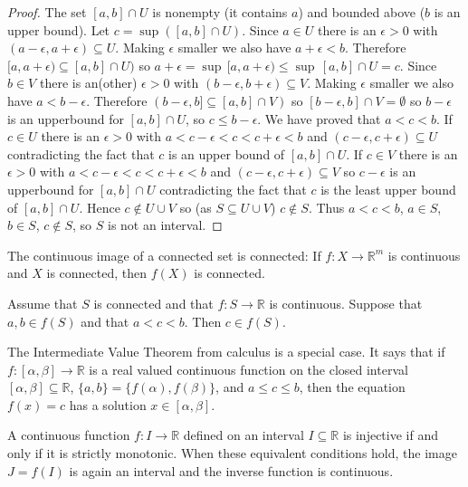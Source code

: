 \documentclass[10pt,a4paper,UTF8]{article}
\begin{document}
\begin{proof}
The set \([a,b]\cap U\) is nonempty (it contains \(a\)) and bounded above (\(b\) is an upper bound).
Let \(c=\sup([a,b]\cap U)\).
Since \(a\in U\) there is an \(\epsilon > 0\) with \((a-\epsilon,a+\epsilon)\subseteq U\).
Making \(\epsilon\) smaller we also have \(a+\epsilon < b\).
Therefore \([a,a+\epsilon)\subseteq [a,b]\cap U)\)
so \(a+\epsilon=\sup\,[a,a+\epsilon)\le\sup\, [a,b]\cap U=c\).
Since \(b\in V\) there is an(other) \(\epsilon > 0\) with \((b-\epsilon,b+\epsilon)\subseteq V\).
Making \(\epsilon\) smaller we also have \(a < b-\epsilon\).
Therefore \((b-\epsilon,b]\subseteq [a,b]\cap V)\) so
\([b-\epsilon,b]\cap V=\emptyset\) so \(b-\epsilon\) is an upperbound for \([a,b]\cap U\),
so \(c\le b-\epsilon\). We have proved that \(a < c < b\).
If \(c\in U\) there is an \(\epsilon > 0\)
with \(a < c-\epsilon < c < c+\epsilon < b\) and \((c-\epsilon,c+\epsilon)\subseteq U\) contradicting the fact
that \(c\) is an upper bound of \([a,b]\cap U\).
If \(c\in V\) there is an \(\epsilon > 0\)
with \(a < c-\epsilon < c < c+\epsilon < b\) and \((c-\epsilon,c+\epsilon)\subseteq V\)
so \(c-\epsilon\) is an upperbound for \([a,b]\cap U\)
contradicting the fact
that \(c\) is the least upper bound of \([a,b]\cap U\). Hence \(c\notin U\cup V\) so
(as \(S\subseteq U\cup V\)) \(c\notin S\). Thus \(a < c < b\), \(a\in S\), \(b\in S\), \(c\notin S\),
so \(S\) is not an interval.
\end{proof}

\begin{tikztheorem}
 The continuous image of  a connected set is connected:
 If \(f:X\to\mathbb{R}^m\) is continuous and \(X\) is connected,
then \(f(X)\) is connected.
\end{tikztheorem}
\begin{tikztheorem}
 Assume that \(S\) is connected and that \(f:S\to\mathbb{R}\)
is continuous. Suppose that \(a,b\in f(S)\)
and that \(a <  c  < b\). Then \(c\in f(S)\).
\end{tikztheorem}

 The Intermediate Value Theorem from calculus
is a special case. It says that if
\(f:[\alpha,\beta]\to\mathbb{R}\) is a real valued continuous
function on the closed interval \([\alpha,\beta]\subseteq\mathbb{R}\),
\(\{a,b\}=\{f(\alpha),f(\beta)\}\), and \(a\le c\le b\), then the equation
\(f(x)=c\) has a solution \(x\in[\alpha,\beta]\).
\begin{tikztheorem}
 A continuous function \(f:I\to\mathbb{R}\) defined on an interval \(I\subseteq\mathbb{R}\)
is injective if and only if it is strictly monotonic.
When these equivalent conditions hold, the image \(J=f(I)\) is
again an interval and the inverse function is continuous.
\end{tikztheorem}
\end{document}
